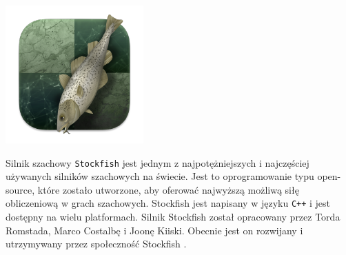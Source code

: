 \documentclass[twoside]{projektInzynierskiMS1}
\begin{document}
\begin{minipage}[t]{0.2\textwidth} 
    \vspace{0pt} 
    \centering
    \includegraphics[width=\linewidth]{images/stockfish_logo.png} 
\end{minipage} 
\hfill 
\begin{minipage}[t]{0.7\textwidth} 
    \vspace{0pt} 
    \justifying 
    \noindent 
    Silnik szachowy \texttt{Stockfish} jest jednym z najpotężniejszych i najczęściej używanych silników szachowych na świecie. Jest to oprogramowanie typu open-source, które zostało utworzone, aby oferować najwyższą możliwą siłę obliczeniową w grach szachowych. Stockfish jest napisany w języku \texttt{C++} i jest dostępny na wielu platformach. Silnik Stockfish został opracowany przez Torda Romstada, Marco Costalbę i Joonę Kiiski. Obecnie jest on rozwijany i utrzymywany przez społeczność Stockfish \cite{StockfishDocs}.
\end{minipage} 
\vspace{1cm}
\end{document}
